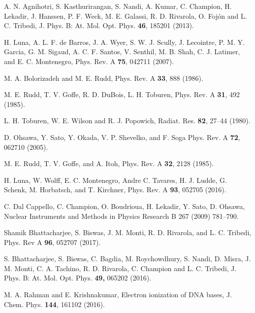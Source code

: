 \documentclass[10pt,showpacs,showkeys,twocolumn]{revtex4}
\begin{document}
\begin{thebibliography}{}
A. N. Agnihotri, S. Kasthurirangan, S. Nandi, A. Kumar, C. Champion, 
H. Lekadir, J. Hanssen, P. F. Weck, M. E. Galassi, R. D. Rivarola, O. Foj\'on and 
L. C. Tribedi, 
J. Phys. B: At. Mol. Opt. Phys. \textbf{46}, 185201 (2013).

H. Luna, A. L. F. de Barros, J. A. Wyer, S. W. J. Scully, J. Lecointre, 
P. M. Y. Garcia, G. M. Sigaud, A. C. F. Santos, V. Senthil, M. B. Shah, 
C. J. Latimer, and E. C. Montenegro,
Phys. Rev. A \textbf{75}, 042711 (2007).

M. A. Bolorizadeh and M. E. Rudd, 
Phys. Rev. A \textbf{33}, 888 (1986). 

M. E. Rudd, T. V. Goffe, R. D. DuBois, L. H. Toburen, 
Phys. Rev. A \textbf{31}, 492 (1985). 

L. H. Toburen, W. E. Wilson and R. J. Popowich,
Radiat. Res. \textbf{82}, 27--44 (1980).

D. Ohsawa, Y. Sato, Y. Okada, V. P. Shevelko, and F. Soga
Phys. Rev. A \textbf{72}, 062710 (2005).

M. E. Rudd, T. V. Goffe, and A. Itoh, 
Phys. Rev. A \textbf{32}, 2128 (1985).


H. Luna, W. Wolff, E. C. Montenegro, Andre C. Tavares, H. J. Ludde, 
G. Schenk, M. Horbatsch, and T. Kirchner, 
Phys. Rev. A \textbf{93}, 052705 (2016).  

C. Dal Cappello, C. Champion, O. Boudrioua, H. Lekadir, Y. Sato, D. Ohsawa, 
Nuclear Instruments and Methods in Physics Research B 267 (2009) 781--790.

Shamik Bhattacharjee, S. Biswas, J. M. Monti, R. D. Rivarola, and L. C. Tribedi,
Phys. Rev A \textbf{96}, 052707 (2017).

S. Bhattacharjee, S. Biswas, C. Bagdia, M. Roychowdhury, S. Nandi, 
D. Misra, J. M. Monti, C. A. Tachino, R. D. Rivarola, C. Champion and 
L. C. Tribedi, J. 
Phys. B: At. Mol. Opt. Phys. \textbf{49,}  065202 (2016).

M. A. Rahman and E. Krishnakumar,
Electron ionization of DNA bases,
J. Chem. Phys. \textbf{144}, 161102 (2016).



\end{thebibliography}
\end{document}

